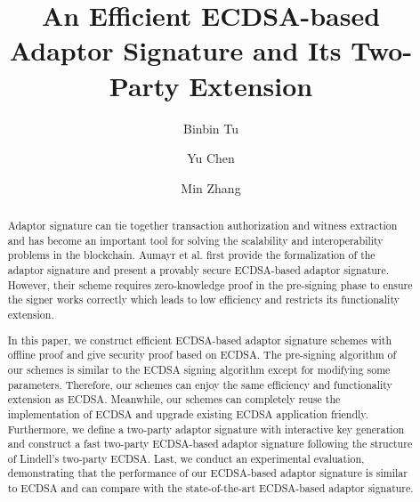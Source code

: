 \documentclass{llncs}
\begin{document}
\title{An Efficient ECDSA-based Adaptor Signature and Its Two-Party Extension}

\author{Binbin Tu \and Yu Chen \and Min Zhang}


\maketitle

\begin{abstract}
Adaptor signature can tie together transaction authorization and witness extraction and has become an important tool for solving the scalability and interoperability problems in the blockchain. Aumayr et al. first provide the formalization of the adaptor signature and present a provably secure ECDSA-based adaptor signature. However, their scheme requires zero-knowledge proof in the pre-signing phase to ensure the signer works correctly which leads to low efficiency and restricts its functionality extension. 

In this paper, we construct efficient ECDSA-based adaptor signature schemes with offline proof and give security proof based on ECDSA. The pre-signing algorithm of our schemes is similar to the ECDSA signing algorithm except for modifying some parameters. Therefore, our schemes can enjoy the same efficiency and functionality extension as ECDSA. Meanwhile, our schemes can completely reuse the implementation of ECDSA and upgrade existing ECDSA application friendly. Furthermore, we define a two-party adaptor signature with interactive key generation and construct a fast two-party ECDSA-based adaptor signature following the structure of Lindell's two-party ECDSA. Last, we conduct an experimental evaluation, demonstrating that the performance of our ECDSA-based adaptor signature is similar to ECDSA and can compare with the state-of-the-art ECDSA-based adaptor signature.



\end{abstract}

\end{document}
